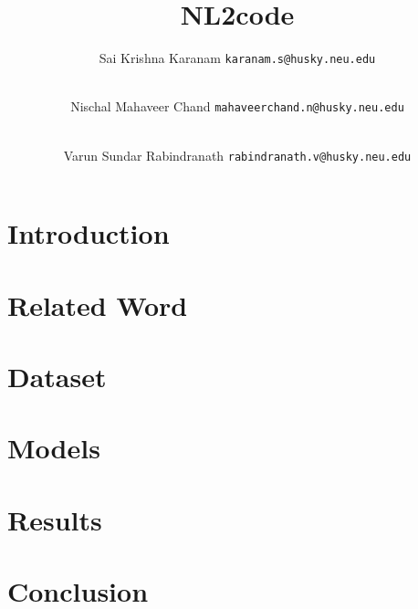 \documentclass{IEEEtran}
\title{\textbf{NL2code}}
\author{
    Sai Krishna Karanam 
    \texttt{karanam.s@husky.neu.edu}
    \and \\
    Nischal Mahaveer Chand 
    \texttt{mahaveerchand.n@husky.neu.edu}
    \and \\
    Varun Sundar Rabindranath 
    \texttt{rabindranath.v@husky.neu.edu}
}
\date{}
\begin{document}
    \maketitle

    \section{Introduction}
    \blindtext

    \section{Related Word}
    \blindtext

    \section{Dataset}
    \blindtext

    \section{Models}
    \blindtext

    \section{Results}
    \blindtext

    \section{Conclusion}
    \blindtext

\end{document}
